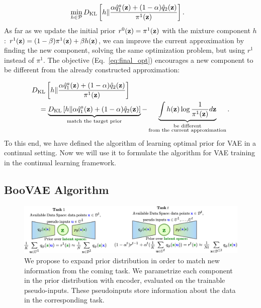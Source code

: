 \begin{equation}
\label{eq:final_opt}
\begin{aligned}
& \min\limits_{h\in\mathcal{P}}\KL{h}{\frac{\alpha\hat{q}_{1}^{a}(\rvz) + (1-\alpha)\hat{q}_{2}(\rvz)}{\pi^{1}(\rvz)}}.
\end{aligned}
\end{equation}
As far as we update the initial prior $r^{0}({\mathbf{z}})=\pi^{1}({\mathbf{z}})$ with the mixture component $h$: $r^1({\mathbf{z}})=(1-\beta)\pi^{1}({\mathbf{z}}) +\beta h({\mathbf{z}})$, we can improve the current approximation by finding the new component, solving the same optimization problem, but using $r^{1}$ instead of $\pi^{1}$. The objective (Eq.~\ref{eq:final_opt}) encourages a new component to be different from the already constructed approximation:

\begin{equation}
\label{eq:diff_encourage}
\begin{aligned}
 &\KL{h}{\frac{\alpha\hat{q}_{1}^{a}(\rvz) + (1-\alpha)\hat{q}_{2}(\rvz)}{\pi^{1}(\rvz)}}  \\
&\quad = \underbrace{\KL{h}{\alpha\hat{q}_{1}^{a}(\rvz) + (1-\alpha)\hat{q}_{2}(\rvz)}}_{\text{match the target prior}} 
-  \underbrace{\int h(\rvz)\log\frac{1}{\pi^{1}(\rvz)} d\rvz}_{\substack{\text{be different} \\ \text{from the current approximation}}}.
\end{aligned}
\end{equation}
To this end, we have defined the algorithm of learning optimal prior for VAE in a continual setting. Now we will use it to formulate the algorithm for VAE training in the continual learning framework. 
\subsection{BooVAE Algorithm}
\begin{figure}[t]
	\centering
		\includegraphics[width=1.0\textwidth]{pics/1_boovae/kek.png}
	\caption{We propose to expand prior distribution in order to match new information from the coming task. We parametrize each component in the prior distribution with encoder, evaluated on the trainable pseudo-inputs. These pseudoinputs store information about the data in the corresponding task.}\label{fig:sheme_inc}
\end{figure}

